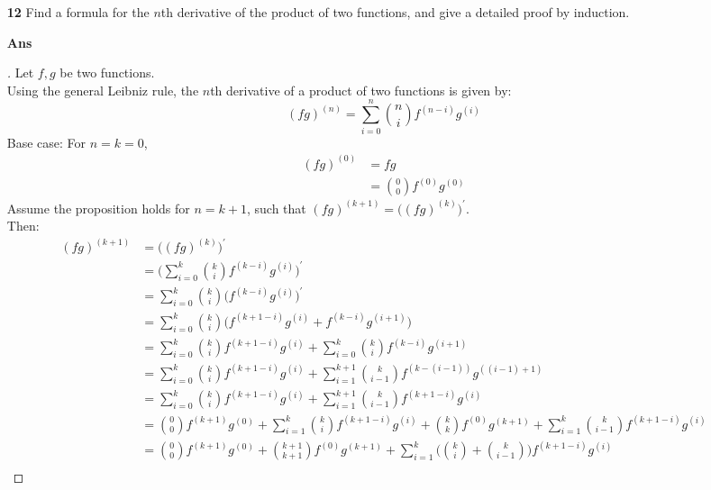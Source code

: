 \documentclass[paper=usletter, fontsize=12pt]{article}
\begin{document}
\begin{itemize}
\begin{itemize}
            \item[\textbf{12}] Find a formula for the $n$th derivative of the
            product of two functions, and give a detailed proof by induction.
            \item[\textbf{Ans}]
            \begin{proof}[\unskip\nopunct]
                Let $f, g$ be two functions. \\ Using the general Leibniz rule,
                the $n$th derivative of a product of two functions is given by:
                \begin{equation*}
                    (fg)^{(n)} = \sum_{i=0}^{n} \binom{n}{i}f^{(n-i)}g^{(i)}
                \end{equation*}
                Base case: For $n = k = 0$,
                \begin{align*}
                    (fg)^{(0)} & = fg \\
                    & = \binom{0}{0}f^{(0)}g^{(0)}
                \end{align*}
                Assume the proposition holds for $n = k + 1$, such that
                $(fg)^{(k+1)} = \big((fg)^{(k)}\big)^\prime$. \\ Then:
                \begin{align*}
                    (fg)^{(k+1)} & = \big((fg)^{(k)}\big)^\prime \\
                    & = \Bigg(\sum_{i=0}^{k} \binom{k}{i}f^{(k-i)}g^{(i)}\Bigg)^\prime \\
                    & = \sum_{i=0}^{k} \binom{k}{i}\big(f^{(k-i)}g^{(i)}\big)^\prime \\
                    & = \sum_{i=0}^{k} \binom{k}{i}\big(f^{(k+1-i)}g^{(i)} + f^{(k-i)}g^{(i+1)}\big) \\
                    & = \sum_{i=0}^{k} \binom{k}{i}f^{(k+1-i)}g^{(i)} + \sum_{i=0}^{k} \binom{k}{i}f^{(k-i)}g^{(i+1)} \\
                    & = \sum_{i=0}^{k} \binom{k}{i}f^{(k+1-i)}g^{(i)} + \sum_{i=1}^{k+1} \binom{k}{i-1}f^{(k-(i-1))}g^{((i-1)+1)} \\
                    & = \sum_{i=0}^{k} \binom{k}{i}f^{(k+1-i)}g^{(i)} + \sum_{i=1}^{k+1} \binom{k}{i-1}f^{(k+1-i)}g^{(i)} \\
                    & = \binom{0}{0}f^{(k+1)}g^{(0)} + \sum_{i=1}^{k} \binom{k}{i}f^{(k+1-i)}g^{(i)} + \binom{k}{k}f^{(0)}g^{(k+1)} + \sum_{i=1}^{k} \binom{k}{i-1}f^{(k+1-i)}g^{(i)} \\
                    & = \binom{0}{0}f^{(k+1)}g^{(0)} + \binom{k+1}{k+1}f^{(0)}g^{(k+1)} + \sum_{i=1}^{k} \bigg(\binom{k}{i} + \binom{k}{i-1}\bigg)f^{(k+1-i)}g^{(i)} \\

\end{align*}
\end{proof}
\end{itemize}
\end{itemize}
\end{document}
